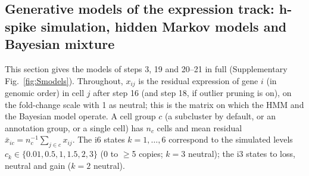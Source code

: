 %
%

\subsection*{Generative models of the expression track: h-spike simulation, hidden Markov models and Bayesian mixture}
\label{sec:supp_models}

This section gives the models of steps 3, 19 and 20--21 in full (Supplementary Fig.~\ref{fig:Smodels}). Throughout, $x_{ij}$ is the residual expression of gene $i$ (in genomic order) in cell $j$ after step 16 (and step 18, if outlier pruning is on), on the fold-change scale with 1 as neutral; this is the matrix on which the HMM and the Bayesian model operate. A cell group $c$ (a subcluster by default, or an annotation group, or a single cell) has $n_c$ cells and mean residual $\bar x_{ic} = n_c^{-1}\sum_{j\in c} x_{ij}$. The i6 states $k=1,\dots,6$ correspond to the simulated levels $c_k\in\{0.01, 0.5, 1, 1.5, 2, 3\}$ (0 to $\geq$5 copies; $k=3$ neutral); the i3 states to loss, neutral and gain ($k=2$ neutral).

